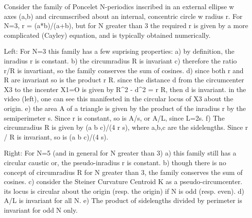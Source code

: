 Consider the family of Poncelet N-periodics inscribed in an external ellipse w axes (a,b) and circumscribed about an internal, concentric circle w radius r. For N=3, r = (a*b)/(a+b), but for N greater than 3 the required r is given by a more complicated (Cayley) equation, and is typically obtained numerically.

Left: For N=3 this family has a few suprising properties:
a) by definition, the inradius r is constant.
b) the circumradius R is invariant
c) therefore the ratio r/R is invartiant, so the family conserves the sum of cosines.
d) since both r and R are invariant so is the product r R. since the distance d from the circumcenter X3 to the incenter X1=O is  given by R^2 - d^2 = r R, then d is invariant. in the video (left), one can see this manifested in the circular locus of X3 about the origin.
e) the area A of a triangle is given by the product of the inradius r by the semiperimeter s. Since r is constant, so is A/s, or A/L, since L=2s.
f) The circumradius R is given by (a b c)/(4 r s), where a,b,c are the sidelengths. Since r / R is invariant, so is (a b c)/(4 s).

Right: For N=5 (and in general for N greater than 3)
a) this family still has a circular caustic or, the pseudo-inradius r is constant.
b) though there is no concept of circumradius R for N greater than 3, the family conserves the sum of cosines.
c) consider the Steiner Curvature Centroid K as a pseudo-circumcenter. its locus is circular about the origin (resp. the origin) if N is odd (resp. even).
d) A/L is invariant for all N.
e) The product of sidelengths divided by perimeter is invariant for odd N only.